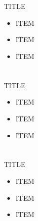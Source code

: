 \documentclass[14pt,dvipdfmx]{beamer}
\begin{document}
\section[]{}
\begin{frame}[containsverbatim,c]{%
TITLE}
\begin{center}
\footnotesize
{\setlength{\leftmargini}{12pt}
\setlength{\leftmarginii}{16pt}
\begin{itemize}
 \item
ITEM
 \item
ITEM
 \item
ITEM
\end{itemize}}
\end{center}
\end{frame}

\section[]{}
\begin{frame}[containsverbatim,c]{%
TITLE}
\begin{center}
\footnotesize
{\setlength{\leftmargini}{12pt}
\setlength{\leftmarginii}{16pt}
\begin{itemize}
 \item
ITEM
 \item
ITEM
 \item
ITEM
\end{itemize}}
\end{center}
\end{frame}

\section[]{}
\begin{frame}[containsverbatim,c]{%
TITLE}
\begin{center}
\footnotesize
{\setlength{\leftmargini}{12pt}
\setlength{\leftmarginii}{16pt}
\begin{itemize}
 \item
ITEM
 \item
ITEM
 \item
ITEM
\end{itemize}}
\end{center}
\end{frame}
\end{document}
